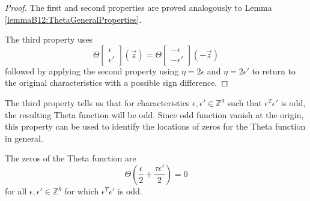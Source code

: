 \begin{proof}
    The first and second properties are proved analogously to Lemma \ref{lemmaB12:ThetaGeneralProperties}.

    The third property uses
    \begin{equation}
        \Theta\begin{bmatrix}\epsilon \\ \epsilon'\end{bmatrix}(\vec z) = \Theta\begin{bmatrix}-\epsilon \\ -\epsilon'\end{bmatrix}(-\vec z)
    \end{equation}
    followed by applying the second property using $\eta=2\epsilon$ and $\eta=2\epsilon'$ to return to the original characteristics with a possible sign difference.
\end{proof}

The third property tells us that for characteristics $\epsilon,\epsilon' \in \mathbb Z^g$ such that $\epsilon^T\epsilon'$ is odd, the resulting Theta function will be odd. Since odd function vanish at the origin, this property can be used to identify the locations of zeros for the Theta function in general.

\begin{theorem}\label{thmB12:OddLocations}
    The zeros of the Theta function are
    \begin{equation}
        \Theta\left(\frac{\epsilon}{2} + \frac{\tau \epsilon'}{2}\right) = 0
    \end{equation}
    for all $\epsilon,\epsilon' \in \mathbb Z^g$ for which $\epsilon^T \epsilon'$ is odd.
\end{theorem}


